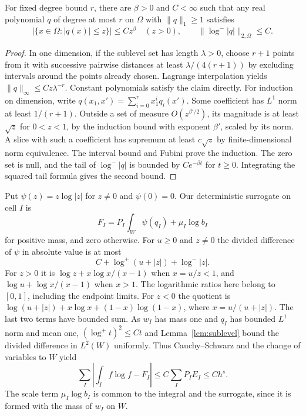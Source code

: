 \begin{lemma}\label{lem:sublevel}
For fixed degree bound \(r\), there are \(\beta>0\) and \(C<\infty\)
such that any real polynomial \(q\) of degree at most \(r\) on
\(\Omega\) with \(\|q\|_1\ge1\) satisfies
\[
 |\{x\in\Omega:|q(x)|\le z\}|\le C z^\beta
 \quad(z>0),\qquad \|\log^-|q|\|_{2,\Omega}\le C .
\]
\end{lemma}
\begin{proof}
In one dimension, if the sublevel set has length \(\lambda>0\),
choose \(r+1\) points from it with successive pairwise distances at
least \(\lambda/(4(r+1))\) by excluding intervals around the
points already chosen. Lagrange interpolation yields
\(\|q\|_\infty\le C z\lambda^{-r}\). Constant polynomials satisfy
the claim directly. For induction on dimension, write
\(q(x_1,x')=\sum_{i=0}^r x_1^i q_i(x')\).
Some coefficient has \(L^1\) norm at least \(1/(r+1)\). Outside
a set of measure \(O(z^{\beta'/2})\), its magnitude is at least
\(\sqrt z\) for \(0<z<1\), by the induction bound with exponent
\(\beta'\), scaled by its norm. A slice with such a coefficient
has supremum at least \(c\sqrt z\) by finite-dimensional norm
equivalence. The interval bound and Fubini prove the induction.
The zero set is null, and the tail of \(\log^-|q|\) is bounded
by \(C e^{-\beta t}\) for \(t\ge0\). Integrating the squared
tail formula gives the second bound.
\end{proof}

Put \(\psi(z)=z\log|z|\) for \(z\ne0\) and \(\psi(0)=0\).
Our deterministic surrogate on cell \(I\) is
\begin{equation}\label{eq:surrogate}
 F_I=P_I\int_W\psi(q_I)+\mu_I\log b_I
\end{equation}
for positive mass, and zero otherwise. For \(u\ge0\) and \(z\ne0\)
the divided difference of \(\psi\) in absolute value is at most
\[
 C+\log^+(u+|z|)+\log^-|z|.
\]
For \(z>0\) it is \(\log z + x\log x/(x-1)\) when \(x=u/z<1\),
and \(\log u+\log x/(x-1)\) when \(x>1\). The logarithmic ratios
here belong to \([0,1]\), including the endpoint limits. For \(z<0\)
the quotient is \(\log(u+|z|)+x\log x+(1-x)\log(1-x)\),
where \(x=u/(u+|z|)\). The last two terms have bounded sum.
As \(w_I\) has mass one and \(q_I\) has bounded \(L^1\) norm and
mean one, \((\log^+ t)^2\le C t\) and Lemma~\ref{lem:sublevel}
bound the divided difference in \(L^2(W)\) uniformly. Thus
Cauchy--Schwarz and the change of variables to \(W\) yield
\begin{equation}\label{eq:transfer}
 \sum_I\left|\int_I f\log f-F_I\right|
 \le C\sum_I P_I E_I\le C h^s .
\end{equation}
The scale term \(\mu_I\log b_I\) is common to the integral and
the surrogate, since it is formed with the mass of \(w_I\) on \(W\).

